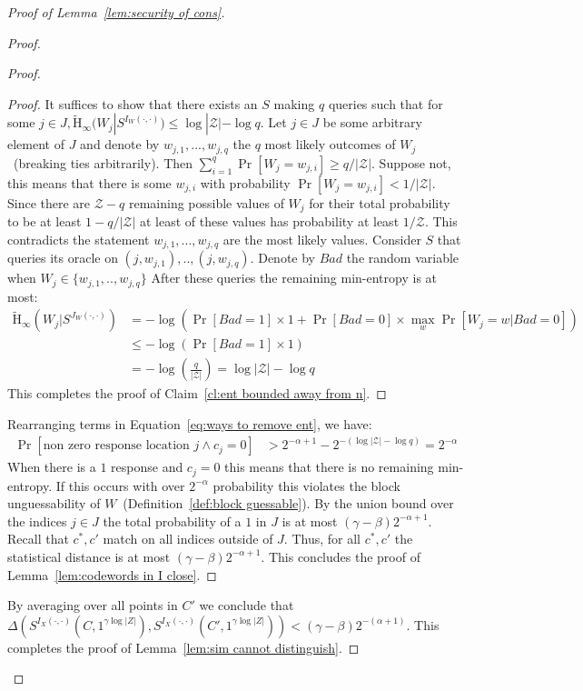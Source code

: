 \documentclass[11pt]{article}
\newcommand{\defref}[1]{\mbox{Definition~\ref{#1}}}
\newcommand{\lemref}[1]{\mbox{Lemma~\ref{#1}}}
\newcommand{\clref}[1]{\mbox{Claim~\ref{#1}}}
\newcommand{\Hav}{\tilde{\mathrm{H}}_\infty}
\begin{document}
\begin{proof}[Proof of \lemref{lem:security of cons}]
\begin{proof}
\begin{proof}
\begin{proof}
It suffices to show that there exists an $S$ making $q$ queries such that for some $j\in J, \Hav(W_j | S^{I_{W}(\cdot, \cdot)})\le \log |\mathcal{Z}| - \log q$.  Let $j\in J$ be some arbitrary element of $J$ and denote by $w_{j,1}, ..., w_{j,q}$ the $q$ most likely outcomes of $W_j$~(breaking ties arbitrarily).  Then $\sum_{i=1}^q \Pr[W_j = w_{j,i}]\geq q/|\mathcal{Z}|$.  Suppose not, this means that there is some $w_{j,i}$ with probability $\Pr[W_j = w_{j,i}] < 1/|\mathcal{Z}|$.  Since there are $\mathcal{Z} - q $ remaining possible values of $W_j$ for their total probability to be at least $1-q/|\mathcal{Z}|$ at least of these values has probability at least $1/\mathcal{Z}$.  This contradicts the statement $w_{j,1},..., w_{j,q}$ are the most likely values.  Consider $S$ that queries its oracle on $(j, w_{j,1}),.., (j, w_{j,q})$.  Denote by $Bad$ the random variable when $W_j\in \{w_{j,1},.., w_{j,q}\}$  After these queries the remaining min-entropy is at most:
\begin{align*}
\Hav(W_j | S^{J_W(\cdot, \cdot)}) &=  -\log \left(\Pr[Bad=1]\times 1+ \Pr[Bad=0]\times \max_{w}\Pr[W_j = w| Bad =0]\right)\\
&\leq  -\log \left(\Pr[Bad=1]\times 1\right)\\
&=-\log\left( \frac{q}{|\mathcal{Z}|} \right) = \log|\mathcal{Z}|-\log q
\end{align*}
This completes the proof of \clref{cl:ent bounded away from n}.
\end{proof}
\noindent
Rearranging terms in Equation~\ref{eq:ways to remove ent}, we have:
\begin{align*}
 \Pr[\text{non zero response location }j \wedge c_j=0] &>2^{-\alpha+1} - 2^{-(\log |\mathcal{Z}|-\log q)}=  2^{-\alpha}
 \end{align*}
 When there is a $1$ response and $c_j=0$ this means that there is no remaining min-entropy.  If this occurs with over $2^{-\alpha}$ probability this violates the block unguessability of $W$~(\defref{def:block guessable}).  By the union bound over the indices $j\in J$ the total probability of a $1$ in $J$ is at most $(\gamma-\beta)2^{-\alpha+1}$. Recall that $c^*, c'$ match on all indices outside of $J$. Thus, for all $c^*, c'$ the statistical distance is at most $(\gamma- \beta)2^{-\alpha+1}$.  This concludes the proof of \lemref{lem:codewords in I close}.
\end{proof}
By averaging over all points in $C'$ we conclude that $\Delta(S^{I_X(\cdot, \cdot)}(C, 1^{\gamma \log |Z|}), S^{I_X(\cdot, \cdot)}(C', 1^{\gamma \log |Z|})) < (\gamma -\beta)2^{-(\alpha+1)}$.  This completes the proof of \lemref{lem:sim cannot distinguish}.
\end{proof}


\end{proof}
\end{document}
